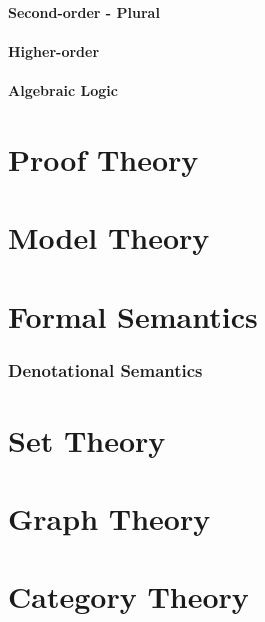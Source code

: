 \documentclass{article}
\begin{document}
\subsection{Second-order - Plural}

\subsection{Higher-order}

\subsection{Algebraic Logic}



\part{Proof Theory}


\part{Model Theory}


\part{Formal Semantics}

\section{Denotational Semantics}


\part{Set Theory}


\part{Graph Theory}


\part{Category Theory}

\end{document}
